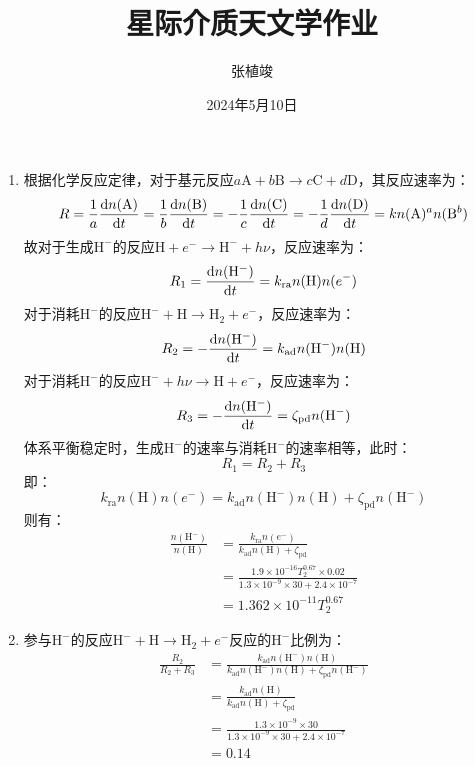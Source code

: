\documentclass[a4paper,fontset=none]{ctexart}
\title{\textbf{星际介质天文学作业}}
\author{张植竣}
\date{2024年5月10日}
\begin{document}
\maketitle

\begin{enumerate}
    \item[31.1 (a)]
    根据化学反应定律，对于基元反应$a\mathrm{A} + b\mathrm{B} \to c\mathrm{C} + d\mathrm{D}$，其反应速率为：
    \[
        R = \frac{1}{a} \odv{n(\mathrm{A})}{t} = \frac{1}{b} \odv{n(\mathrm{B})}{t} = -\frac{1}{c} \odv{n(\mathrm{C})}{t} = -\frac{1}{d} \odv{n(\mathrm{D})}{t} = k n(\mathrm{A})^a n(\mathrm{B}^b)
    \]
    故对于生成$\mathrm{H}^-$的反应$\mathrm{H} + e^- \to \mathrm{H}^- +h\nu$，反应速率为：
    \[
        R_1 = \odv{n(\mathrm{H}^-)}{t} = k_{\mathrm{ra}} n(\mathrm{H}) n(e^-)
    \]
    对于消耗$\mathrm{H}^-$的反应$\mathrm{H}^- + \mathrm{H} \to \mathrm{H}_2 + e^-$，反应速率为：
    \[
        R_2 = -\odv{n(\mathrm{H}^-)}{t} = k_{\mathrm{ad}} n(\mathrm{H}^-) n(\mathrm{H})
    \]
    对于消耗$\mathrm{H}^-$的反应$\mathrm{H}^- + h\nu \to \mathrm{H} + e^-$，反应速率为：
    \[
    R_3 = -\odv{n(\mathrm{H}^-)}{t} = \zeta_{\mathrm{pd}} n(\mathrm{H}^-)
    \]
    体系平衡稳定时，生成$\mathrm{H}^-$的速率与消耗$\mathrm{H}^-$的速率相等，此时：
    \[
        R_1 = R_2 + R_3
    \]
    即：
    \[
        k_{\mathrm{ra}} n(\mathrm{H}) n(e^-) = k_{\mathrm{ad}} n(\mathrm{H}^-) n(\mathrm{H}) + \zeta_{\mathrm{pd}} n(\mathrm{H}^-)
    \]
    则有：
    \begin{align*}
        \frac{n(\mathrm{H}^-)}{n(\mathrm{H})}
        &= \frac{k_{\mathrm{ra}} n(e^-)}{k_{\mathrm{ad}} n(\mathrm{H}) + \zeta_{\mathrm{pd}}} \\
        &= \frac{1.9 \times 10^{-16} T_2^{0.67} \times 0.02}{1.3 \times 10^{-9} \times 30 + 2.4 \times 10^{-7}} \\
        &= 1.362 \times 10^{-11} T_2^{0.67}
    \end{align*}

    \medskip
    \item[31.1 (b)]
    参与$\mathrm{H}^-$的反应$\mathrm{H}^- + \mathrm{H} \to \mathrm{H}_2 + e^-$反应的$\mathrm{H}^-$比例为：
    \begin{align*}
        \frac{R_2}{R_2 + R_3}
        &= \frac{k_{\mathrm{ad}} n(\mathrm{H}^-) n(\mathrm{H})}{k_{\mathrm{ad}} n(\mathrm{H}^-) n(\mathrm{H}) + \zeta_{\mathrm{pd}} n(\mathrm{H}^-)} \\
        &= \frac{k_{\mathrm{ad}} n(\mathrm{H})}{k_{\mathrm{ad}} n(\mathrm{H}) + \zeta_{\mathrm{pd}}} \\
        &= \frac{1.3 \times 10^{-9} \times 30}{1.3 \times 10^{-9} \times 30 + 2.4 \times 10^{-7}} \\
        &= 0.14
    \end{align*}


\end{enumerate}
\end{document}
